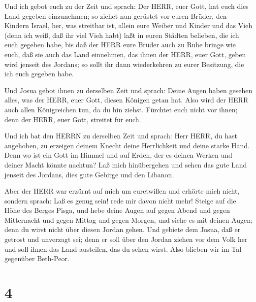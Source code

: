  Und ich gebot euch zu der Zeit und sprach: Der HERR, euer
Gott, hat euch dies Land gegeben einzunehmen; so ziehet nun gerüstet vor
euren Brüder, den Kindern Israel, her, was streitbar ist, 
allein eure Weiber und Kinder und das Vieh (denn ich weiß, daß ihr viel
Vieh habt) laßt in euren Städten belieben, die ich euch gegeben habe,
 bis daß der HERR eure Brüder auch zu Ruhe bringe wie euch,
daß sie auch das Land einnehmen, das ihnen der HERR, euer Gott, geben
wird jenseit des Jordans; so sollt ihr dann wiederkehren zu eurer
Besitzung, die ich euch gegeben habe.

 Und Josua gebot ihnen zu derselben Zeit und sprach: Deine
Augen haben gesehen alles, was der HERR, euer Gott, diesen Königen getan
hat. Also wird der HERR auch allen Königreichen tun, da du hin ziehst.
 Fürchtet euch nicht vor ihnen; denn der HERR, euer Gott,
streitet für euch.

 Und ich bat den HERRN zu derselben Zeit und sprach:
 Herr HERR, du hast angehoben, zu erzeigen deinem Knecht
deine Herrlichkeit und deine starke Hand. Denn wo ist ein Gott im Himmel
und auf Erden, der es deinen Werken und deiner Macht könnte nachtun?
 Laß mich hinübergehen und sehen das gute Land jenseit des
Jordans, dies gute Gebirge und den Libanon.

 Aber der HERR war erzürnt auf mich um euretwillen und
erhörte mich nicht, sondern sprach: Laß es genug sein! rede mir davon
nicht mehr!  Steige auf die Höhe des Berges Pisga, und hebe
deine Augen auf gegen Abend und gegen Mitternacht und gegen Mittag und
gegen Morgen, und siehe es mit deinen Augen; denn du wirst nicht über
diesen Jordan gehen.  Und gebiete dem Josua, daß er getrost
und unverzagt sei; denn er soll über den Jordan ziehen vor dem Volk her
und soll ihnen das Land austeilen, das du sehen wirst. 
Also blieben wir im Tal gegenüber Beth-Peor.

\hypertarget{section-3}{%
\section{4}\label{section-3}}

